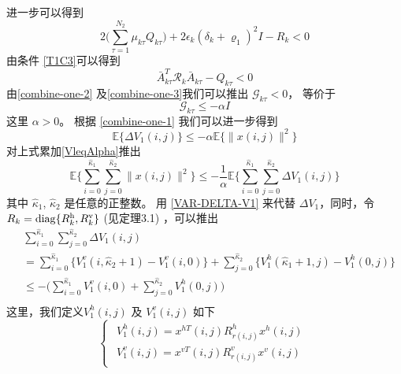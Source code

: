 	进一步可以得到
	\begin{equation}\label{combine-one-2}
	2\big(\sum_{\tau =1}^{N_{2}}\mu_{k\tau }Q_{k\tau }\big)+2\epsilon_{k}(\delta_{k}+\varrho_{1})^{2}I-R_{k} < 0
	\end{equation}
	由条件 \eqref{T1C3}可以得到 
	\begin{equation}\label{combine-one-3}
	\bar{A}^{T}_{k\tau }\mathcal{R}_{k}\bar{A}_{k\tau }-Q_{k\tau } < 0
	\end{equation}
	由\eqref{combine-one-2} 及\eqref{combine-one-3}我们可以推出 $\mathcal{G}_{k\tau }<0$， 等价于
	\begin{equation}
	\mathcal{G}_{k\tau } \leq -\alpha I
	\end{equation}
	这里 $\alpha>0$。
	根据 \eqref{combine-one-1} 我们可以进一步得到
	\begin{equation}\label{VleqAlpha}
	\mathbb{E}\{\varDelta V_{1}(i,j) \} \leq-\alpha \mathbb{E}\{\|x(i,j)\|^{2} \}
	\end{equation}
	对上式累加\eqref{VleqAlpha}推出
	\begin{equation} \label{levE}
	\mathbb{E}\Big\{\sum_{i=0}^{\hat{\kappa}_{1}}\sum_{j=0}^{\hat{\kappa}_{2}}  \|x(i,j)\|^{2} \Big\} \leq -\frac{1}{\alpha} \mathbb{E}\Big\{\sum_{i=0}^{\hat{\kappa}_{1}}\sum_{j=0}^{\hat{\kappa}_{2}}  \varDelta V_{1}(i,j)  \Big\}
	\end{equation}
	其中 $\hat{\kappa}_{1}$, $\hat{\kappa}_{2}$ 是任意的正整数。 用 \eqref{VAR-DELTA-V1} 来代替 $\varDelta V_{1}$，同时，令 $R_{k}=\mathrm{diag}\{R^{\rm{h}}_{k},R^{\rm{v}}_{k}\}$ (见定理3.1) ，可以推出
	\begin{equation} \label{Vhv}
	\begin{split}
	&\sum_{i=0}^{\hat{\kappa}_{1}}\sum_{j=0}^{\hat{\kappa}_{2}}  \varDelta V_{1}(i,j)\\&= \sum_{i=0}^{\hat{\kappa}_{1}}\big\{V^{v}_{1}(i,\hat{\kappa}_{2}+1) - V^{v}_{1}(i,0) \big\}+  \sum_{j=0}^{\hat{\kappa}_{2}}\big\{V^{h}_{1}(\hat{\kappa}_{1}+1,j) - V^{h}_{1}(0,j) \big\}\\
	&\leq -\big( \sum_{i=0}^{\hat{\kappa}_{1}}V^{v}_{1}(i,0) + \sum_{j=0}^{\hat{\kappa}_{2}}V^{h}_{1}(0,j)\big) \\
	\end{split}
	\end{equation} 
	这里，我们定义$V_{1}^{h}(i,j)$ 及 $V_{1}^{v}(i,j)$ 如下  
	\begin{equation*}
	\left\{
	\begin{array}{lr}
	\begin{split}
	V^{h}_{1}(i,j)=x^{hT}(i,j)R^{h}_{r(i,j)}x^{h}(i,j)\\
	V^{v}_{1}(i,j)=x^{vT}(i,j)R^{v}_{r(i,j)}x^{v}(i,j)
	\end{split}
	\end{array}
	\right.
	\end{equation*}
